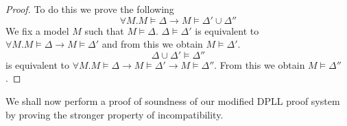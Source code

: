 \begin{mytheorem}
\begin{proof}
%
To do this we prove the following
$$\forall M. M \models \Delta \to M \models \Delta' \cup \Delta''$$
We fix a model $M$ such that $M \models \Delta$. $\Delta \models \Delta'$ is equivalent to $\forall M. M \models \Delta \to M \models \Delta'$ and from this we obtain $M \models \Delta'$. $$\Delta \cup \Delta' \models \Delta''$$ is equivalent to $\forall M. M \models \Delta \to M \models \Delta' \to M \models \Delta''$. From this we obtain $M \models \Delta''$.
\end{proof}
%
\end{mytheorem}
%
We shall now perform a proof of soundness of our modified DPLL proof system by proving the stronger property of incompatibility. \\ \medskip
%
